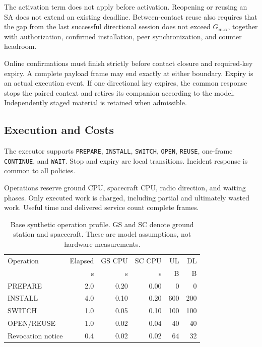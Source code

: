\documentclass[conference]{IEEEtran}
\newcommand{\op}[1]{\texttt{#1}}
\begin{document}
The activation term does not apply before activation.
Reopening or reusing an SA does not extend an existing
deadline.
Between-contact reuse also requires that the gap from the
last successful directional session does not exceed
$G_{\max}$, together with authorization, confirmed
installation, peer synchronization, and counter headroom.

Online confirmations must finish strictly before contact
closure and required-key expiry.
A complete payload frame may end exactly at either boundary.
Expiry is an actual execution event.
If one directional key expires, the common response stops
the paired context and retires its companion according to
the model.
Independently staged material is retained when admissible.

\subsection{Execution and Costs}

The executor supports
\op{PREPARE},
\op{INSTALL},
\op{SWITCH},
\op{OPEN},
\op{REUSE},
one-frame \op{CONTINUE}, and
\op{WAIT}.
Stop and expiry are local transitions.
Incident response is common to all policies.

Operations reserve ground CPU, spacecraft CPU, radio direction,
and waiting phases.
Only executed work is charged, including partial and ultimately
wasted work.
Useful time and delivered service count complete frames.

\begin{table}[!t]
    \centering
    \footnotesize
    \setlength{\tabcolsep}{3.2pt}
    \renewcommand{\arraystretch}{1.12}

    \caption{
        Base synthetic operation profile.
        GS and SC denote ground station and spacecraft.
        These are model assumptions, not hardware measurements.
    }
    \label{tab:costs}

    \begin{tabular}{@{}lrrrrr@{}}
        \toprule
        Operation
        & Elapsed
        & GS CPU
        & SC CPU
        & UL
        & DL \\
        & s & s & s & B & B \\
        \midrule

        PREPARE
        & 2.0 & 0.20 & 0.00 & 0 & 0 \\

        INSTALL
        & 4.0 & 0.10 & 0.20 & 600 & 200 \\

        SWITCH
        & 1.0 & 0.05 & 0.10 & 100 & 100 \\

        OPEN/REUSE
        & 1.0 & 0.02 & 0.04 & 40 & 40 \\

        Revocation notice
        & 0.4 & 0.02 & 0.02 & 64 & 32 \\

        \bottomrule
    \end{tabular}
\end{table}
\end{document}
